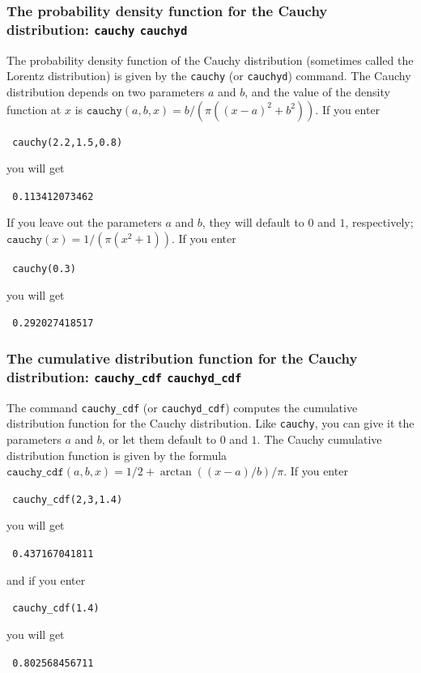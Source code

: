 \documentclass[a4paper,11pt]{book}
\begin{document}
\subsubsection{The probability density function for the Cauchy
distribution: \texttt{cauchy} \texttt{cauchyd}}

The probability density function of the Cauchy distribution (sometimes
called the Lorentz distribution) is given by the
\texttt{cauchy} (or \texttt{cauchyd}) command.  The Cauchy
distribution depends on two parameters $a$ and $b$, and the value of
the density function at $x$ is 
$\texttt{cauchy}(a,b,x) = b/(\pi ((x-a)^2 + b^2))$.
If you enter 
\begin{center}
  \tt
  cauchy(2.2,1.5,0.8)
\end{center}
you will get
\begin{center}
  \tt
  0.113412073462
\end{center}

If you leave out the parameters $a$ and $b$, they will default to $0$
and $1$, respectively; $\texttt{cauchy}(x) = 1/(\pi (x^2 + 1))$.  If
you enter
\begin{center}
  \tt
  cauchy(0.3)
\end{center}
you will get
\begin{center}
  \tt
  0.292027418517
\end{center}

\subsubsection{The cumulative distribution function for the Cauchy
distribution: \texttt{cauchy\_cdf} \texttt{cauchyd\_cdf}}

The command \texttt{cauchy\_cdf} (or \texttt{cauchyd\_cdf}) computes
the cumulative distribution function for the Cauchy distribution.
Like \texttt{cauchy}, you can give it the parameters $a$ and $b$, or
let them default to $0$ and $1$.  The Cauchy cumulative distribution
function is given by the formula
$\texttt{cauchy\_cdf}(a,b,x) = 1/2 + \arctan((x-a)/b)/\pi$.
If you enter
\begin{center}
  \tt
  cauchy\_cdf(2,3,1.4)
\end{center}
you will get
\begin{center}
  \tt
  0.437167041811
\end{center}
and if you enter
\begin{center}
  \tt
  cauchy\_cdf(1.4)
\end{center}
you will get
\begin{center}
  \tt
  0.802568456711
\end{center}
\end{document}
